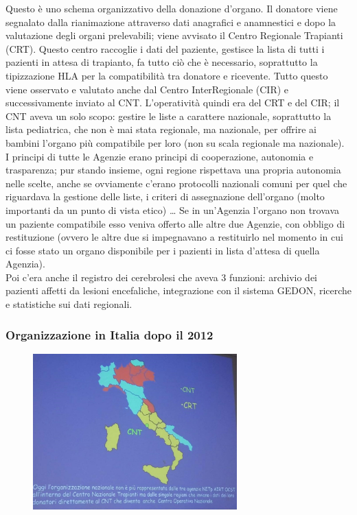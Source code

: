 Questo è uno schema organizzativo della donazione d'organo. Il donatore
viene segnalato dalla rianimazione attraverso dati anagrafici e
anamnestici e dopo la valutazione degli organi prelevabili; viene
avvisato il Centro Regionale Trapianti (CRT). Questo centro raccoglie i
dati del paziente, gestisce la lista di tutti i pazienti in attesa di
trapianto, fa tutto ciò che è necessario, soprattutto la tipizzazione
HLA per la compatibilità tra donatore e ricevente. Tutto questo viene
osservato e valutato anche dal Centro InterRegionale (CIR) e
successivamente inviato al CNT. L'operatività quindi era del CRT e del
CIR; il CNT aveva un solo scopo: gestire le liste a carattere nazionale,
soprattutto la lista pediatrica, che non è mai stata regionale, ma
nazionale, per offrire ai bambini l'organo più compatibile per loro (non
su scala regionale ma nazionale).
\\
I principi di tutte le Agenzie erano principi di cooperazione, autonomia
e trasparenza; pur stando insieme, ogni regione rispettava una propria
autonomia nelle scelte, anche se ovviamente c'erano protocolli nazionali
comuni per quel che riguardava la gestione delle liste, i criteri di
assegnazione dell'organo (molto importanti da un punto di vista etico)
\ldots{} Se in un'Agenzia l'organo non trovava un paziente compatibile
esso veniva offerto alle altre due Agenzie, con obbligo di restituzione
(ovvero le altre due si impegnavano a restituirlo nel momento in cui ci
fosse stato un organo disponibile per i pazienti in lista d'attesa di
quella Agenzia).
\\
Poi c'era anche il registro dei cerebrolesi che aveva 3 funzioni:
archivio dei pazienti affetti da lesioni encefaliche, integrazione con
il sistema GEDON, ricerche e statistiche sui dati regionali.

\subsubsection{Organizzazione in Italia dopo il 2012}


\begin{figure}[!ht]
\centering
	\includegraphics[width=0.7\textwidth]{34/image5.jpeg}
	\end{figure}

